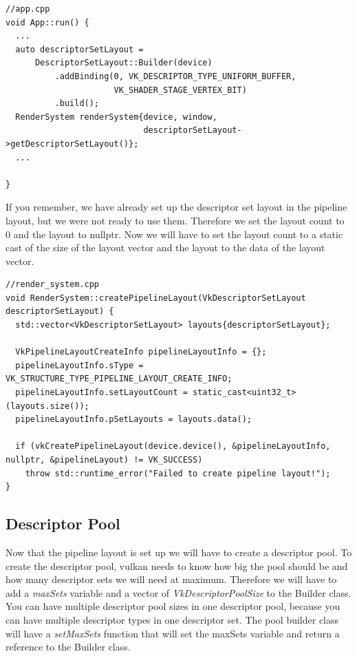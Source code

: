 \documentclass[12pt]{report} \usepackage{preamble}
\begin{document}
\begin{lstlisting}[Language=C++]
//app.cpp
void App::run() {
  ...
  auto descriptorSetLayout =
      DescriptorSetLayout::Builder(device)
          .addBinding(0, VK_DESCRIPTOR_TYPE_UNIFORM_BUFFER,
                      VK_SHADER_STAGE_VERTEX_BIT)
          .build();
  RenderSystem renderSystem{device, window,
                            descriptorSetLayout->getDescriptorSetLayout()};
  ...

}
\end{lstlisting}

If you remember, we have already set up the descriptor set layout in the pipeline layout, but we were not ready to use them. Therefore we set the layout count to 0
and the layout to nullptr. Now we will have to set the layout count to a static cast of the size of the layout vector and the layout to the data of the layout vector.

\begin{lstlisting}[Language=C++]
//render_system.cpp
void RenderSystem::createPipelineLayout(VkDescriptorSetLayout descriptorSetLayout) {
  std::vector<VkDescriptorSetLayout> layouts{descriptorSetLayout};

  VkPipelineLayoutCreateInfo pipelineLayoutInfo = {};
  pipelineLayoutInfo.sType = VK_STRUCTURE_TYPE_PIPELINE_LAYOUT_CREATE_INFO;
  pipelineLayoutInfo.setLayoutCount = static_cast<uint32_t>(layouts.size());
  pipelineLayoutInfo.pSetLayouts = layouts.data();

  if (vkCreatePipelineLayout(device.device(), &pipelineLayoutInfo, nullptr, &pipelineLayout) != VK_SUCCESS)
    throw std::runtime_error("Failed to create pipeline layout!");
}
\end{lstlisting}

\subsection{Descriptor Pool}

Now that the pipeline layout is set up we will have to create a descriptor pool. To create the descriptor pool, vulkan needs
to know how big the pool should be and how many descriptor sets we will need at maximum.
Therefore we will have to add a \textit{maxSets} variable and a vector of \textit{VkDescriptorPoolSize} to the Builder class.
You can have multiple descriptor pool sizes in one descriptor pool, because you can have multiple descriptor types in one descriptor set.
The pool builder class will have a \textit{setMaxSets} function that will set the maxSets variable and return a reference to the Builder class.
\end{document}
